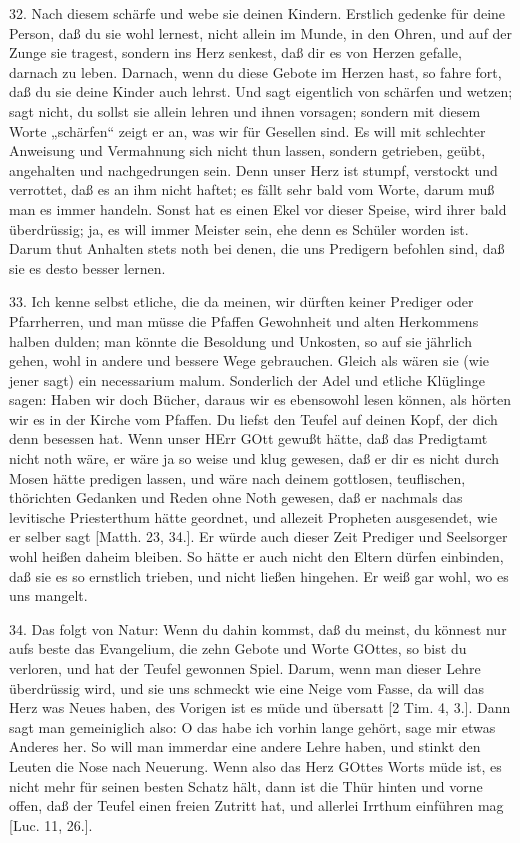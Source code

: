 32. Nach diesem schärfe und webe sie deinen Kindern. Erstlich gedenke für deine Person, daß du sie wohl lernest, nicht allein im Munde, in den Ohren, und auf der Zunge sie tragest, sondern ins Herz senkest, daß dir es von Herzen gefalle, darnach zu leben. Darnach, wenn du diese Gebote im Herzen hast, so fahre fort, daß
du sie deine Kinder auch lehrst. Und sagt eigentlich von schärfen und wetzen; sagt nicht, du sollst sie allein lehren und ihnen vorsagen; sondern mit diesem Worte „schärfen“ zeigt er an, was wir für Gesellen sind. Es will mit schlechter Anweisung und Vermahnung sich nicht thun lassen, sondern getrieben, geübt, angehalten und nachgedrungen sein. Denn unser Herz ist stumpf, verstockt und verrottet, daß es an ihm nicht haftet; es fällt sehr bald vom Worte, darum muß man es immer handeln. Sonst hat es einen Ekel vor dieser Speise, wird ihrer bald überdrüssig; ja, es will immer Meister sein, ehe denn es Schüler worden ist. Darum thut Anhalten stets noth bei denen, die uns Predigern befohlen sind, daß sie es desto besser lernen.

33. Ich kenne selbst etliche, die da meinen, wir dürften keiner Prediger oder Pfarrherren, und man müsse die Pfaffen Gewohnheit und alten Herkommens halben dulden; man könnte die Besoldung und Unkosten, so auf sie jährlich gehen, wohl in andere und bessere Wege gebrauchen. Gleich als wären sie (wie jener sagt) ein necessarium malum. Sonderlich der Adel und etliche Klüglinge sagen: Haben wir doch Bücher, daraus wir es ebensowohl lesen können, als hörten wir es in der Kirche vom Pfaffen. Du liefst den Teufel auf deinen Kopf, der dich denn besessen hat. Wenn unser HErr GOtt gewußt hätte, daß das Predigtamt nicht noth wäre, er wäre ja so weise und klug gewesen, daß er dir es nicht durch Mosen hätte predigen lassen, und wäre nach deinem gottlosen, teuflischen, thörichten Gedanken und Reden ohne Noth gewesen, daß er nachmals das levitische Priesterthum hätte geordnet, und allezeit Propheten ausgesendet, wie er selber sagt [Matth. 23, 34.]. Er würde auch dieser Zeit Prediger und Seelsorger wohl heißen daheim bleiben. So hätte er auch nicht den Eltern dürfen einbinden, daß sie es so ernstlich trieben, und nicht ließen hingehen. Er weiß gar wohl, wo es uns mangelt.

34. Das folgt von Natur: Wenn du dahin kommst, daß du meinst, du könnest nur aufs beste das Evangelium, die zehn Gebote und Worte GOttes, so bist du verloren, und hat der Teufel gewonnen Spiel. Darum, wenn man dieser Lehre überdrüssig wird, und sie uns schmeckt wie eine Neige vom Fasse, da will das Herz was Neues haben, des Vorigen ist es müde und übersatt [2 Tim. 4, 3.]. Dann sagt man gemeiniglich also: O das habe ich vorhin lange gehört, sage mir etwas Anderes her. So will man immerdar eine andere Lehre haben, und stinkt den Leuten die Nose nach Neuerung. Wenn also das Herz GOttes Worts müde ist, es nicht mehr für seinen besten Schatz hält, dann ist die Thür hinten und vorne offen, daß der Teufel einen freien Zutritt hat, und allerlei Irrthum einführen mag [Luc. 11, 26.].

